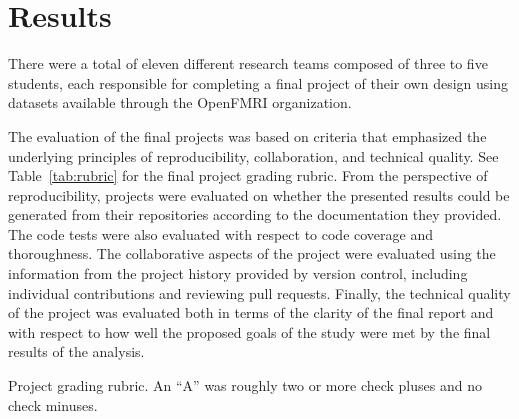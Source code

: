 \section{Results}\label{results}

There were a total of eleven different research teams composed of three
to five students, each responsible for completing a final project of their
own design using datasets available through the OpenFMRI organization.

The evaluation of the final projects was based on criteria that emphasized the
underlying principles of reproducibility, collaboration, and technical
quality.
See Table~\ref{tab:rubric} for the final project grading rubric.
From the perspective of reproducibility, projects were evaluated on whether the
presented results could be generated from their repositories according to the
documentation they provided.
The code tests were also evaluated with respect to code coverage
and thoroughness.
The collaborative aspects of the project were evaluated using the information
from the project history provided by version control, including
individual contributions and reviewing pull requests.
Finally, the technical quality of the project was evaluated both in terms of
the clarity of the final report and with respect to how well the proposed
goals of the study were met by the final results of the analysis.

\begin{table}
\centering
\begin{tiny}

\caption{Project grading rubric.
An ``A'' was roughly two or more check pluses and no check minuses.}
\label{tab:rubric}
\end{tiny}
\end{table}


